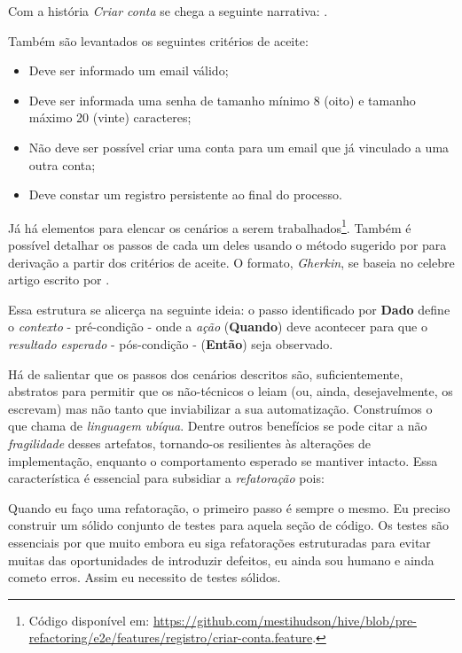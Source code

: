   Com a história \emph{Criar conta} se chega a seguinte narrativa: .

  Também são levantados os seguintes critérios de aceite:
  \begin{itemize}
    \item Deve ser informado um email válido;
    \item Deve ser informada uma senha de tamanho mínimo 8 (oito) e tamanho máximo 20 (vinte) caracteres;
    \item Não deve ser possível criar uma conta para um email que já vinculado a uma outra conta;
    \item Deve constar um registro persistente ao final do processo.
  \end{itemize}

  Já há elementos para elencar os cenários a serem trabalhados\footnote{Código disponível em: \url{https://github.com/mestihudson/hive/blob/pre-refactoring/e2e/features/registro/criar-conta.feature}.}. Também é possível detalhar os passos de cada um deles usando o método sugerido por  para derivação a partir dos critérios de aceite. O formato, \emph{Gherkin}, se baseia no celebre artigo escrito por .

  Essa estrutura se alicerça na seguinte ideia: o passo identificado por \textbf{Dado} define o \emph{contexto} - pré-condição - onde a \emph{ação} (\textbf{Quando}) deve acontecer para que o \emph{resultado esperado} - pós-condição - (\textbf{Então}) seja observado.

  Há de salientar que os passos dos cenários descritos são, suficientemente, abstratos para permitir que os não-técnicos o leiam (ou, ainda, desejavelmente, os escrevam) mas não tanto que inviabilizar a sua automatização. Construímos o que  chama de \emph{linguagem ubíqua}. Dentre outros benefícios se pode citar a não \emph{fragilidade}\cite[pág. 93, tradução nossa]{RoseWynneHellesoy2015} desses artefatos, tornando-os resilientes às alterações de implementação, enquanto o comportamento esperado se mantiver intacto. Essa característica é essencial para subsidiar a \emph{refatoração} pois:

  \citacaolonga
    {Quando eu faço uma refatoração, o primeiro passo é sempre o mesmo. Eu preciso construir um sólido conjunto de testes para aquela seção de código. Os testes são essenciais por que muito embora eu siga refatorações estruturadas para evitar muitas das oportunidades de introduzir defeitos, eu ainda sou humano e ainda cometo erros. Assim eu necessito de testes sólidos.}
    {\cite[p.  17, tradução nossa]{Fowler1999}}

